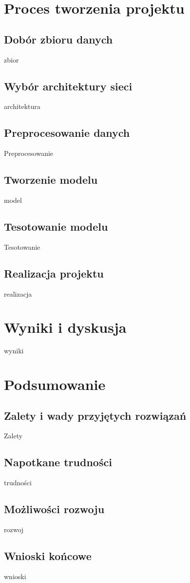 \documentclass[12pt]{article}
\begin{document}
\begin{sloppypar}
\section{Proces tworzenia projektu}
{
  \subsection{Dobór zbioru danych}
  {
    zbior
  }
  \subsection{Wybór architektury sieci}
  {
    architektura
  }
  \subsection{Preprocesowanie danych}
  {
    Preprocesowanie
  }
  \subsection{Tworzenie modelu}
  {
    model
  }
  \subsection{Tesotowanie modelu}
  {
    Tesotowanie
  }
  \subsection{Realizacja projektu}
  {
    realizacja
  }
}

\section{Wyniki i dyskusja}
{
  wyniki
}

\section{Podsumowanie}
{
  \subsection{Zalety i wady przyjętych rozwiązań}
  {
    Zalety
  }
  \subsection{Napotkane trudności}
  {
    trudności
  }
  \subsection{Możliwości rozwoju}
  {
    rozwoj
  }
  \subsection{Wnioski końcowe}
  {
    wnioski
  }
}

\clearpage
\printbibliography[
  heading=bibintoc,
  title={Bibliografia}
]

\clearpage
\listoffigures

\clearpage
\listoftables

\clearpage
{}
\lstlistoflistings

\end{sloppypar}
\end{document}
